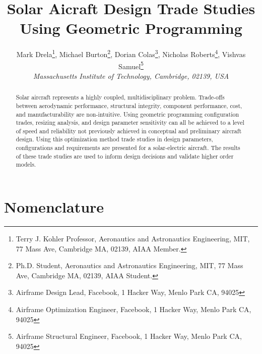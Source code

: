 \documentclass[]{aiaa-tc}%
\title{Solar Aicraft Design Trade Studies Using Geometric Programming}
\author{
  Mark Drela\thanks{Terry J. Kohler Professor, Aeronautics and Astronautics Engineering, MIT, 77 Mass Ave, Cambridge MA, 02139, AIAA Member.}, 
  Michael Burton\thanks{Ph.D. Student, Aeronautics and Astronautics Engineering, MIT, 77 Mass Ave, Cambridge MA, 02139, AIAA Student.}, 
  Dorian Colas\thanks{Airframe Design Lead, Facebook, 1 Hacker Way, Menlo Park CA, 94025}, 
  Nicholas Roberts\thanks{Airframe Optimization Engineer, Facebook, 1 Hacker Way, Menlo Park CA, 94025}, 
  Vishvas Samuel\thanks{Airframe Structural Engineer, Facebook, 1 Hacker Way, Menlo Park CA, 94025}\\
  {\normalsize\itshape
   Massachusetts Institute of Technology, Cambridge, 02139, USA}\\
 }
\begin{document}
\graphicspath{{./figs/}} 
\maketitle

\begin{abstract}
    Solar aircraft represents a highly coupled, multidisciplinary problem. 
    Trade-offs between aerodynamic performance, structural integrity, component performance, cost, and manufacturability are non-intuitive. 
    Using geometric programming configuration trades, resizing analysis, and design parameter sensitivity can all be achieved to a level of speed and reliability not previously achieved in conceptual and preliminary aircraft design. 
    Using this optimization method trade studies in design parameters, configurations and requirements are presented for a solar-electric aircraft.  
    The results of these trade studies are used to inform design decisions and validate higher order models. 
\end{abstract}

\section*{Nomenclature}
\end{document}
